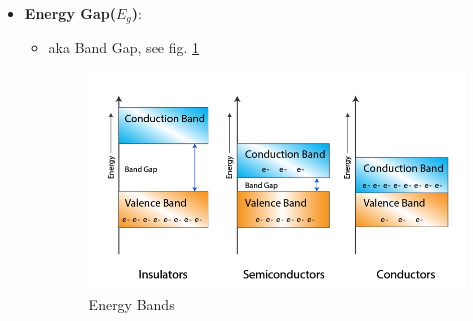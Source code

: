\documentclass[10pt, a4paper]{report}
\begin{document}
\begin{itemize}
\begin{itemize}
			\item $ I_0 $ is 7\% higher for 1\degree C rise in temp.
			\item Si is better for high temp because smaller $ I_0 $, which can eliminate false triggering.
		\end{itemize}
		\item \textbf{Energy Gap($ E_g $)}:\begin{itemize}
			\item aka Band Gap, see fig. \ref{fig:energy-band-diagram}
			\begin{figure}
				\centering
				\includegraphics[width=0.7\linewidth]{img/Energy-band-diagram}
				\caption[Energy Bands]{Energy Bands}
				\label{fig:energy-band-diagram}
			\end{figure}
			

\end{itemize}
\end{itemize}
\end{document}

